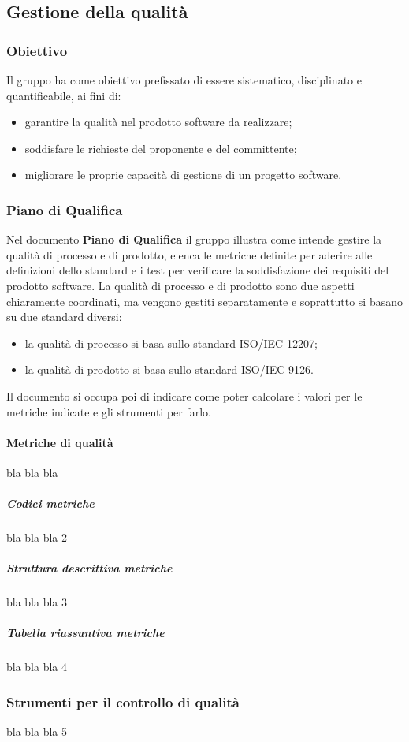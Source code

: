 \subsection{Gestione della qualità}
\subsubsection{Obiettivo}
Il gruppo \Gruppo{} ha come obiettivo prefissato di essere sistematico, disciplinato e quantificabile, ai fini di:
\begin{itemize}
    \item garantire la qualità nel prodotto software da realizzare;
    \item soddisfare le richieste del proponente e del committente;
    \item migliorare le proprie capacità di gestione di un progetto software.
\end{itemize}

\subsubsection{Piano di Qualifica}
Nel documento \textbf{Piano di Qualifica} il gruppo illustra come intende gestire la qualità di processo e di prodotto, elenca le metriche definite per aderire alle definizioni dello standard e i test per verificare la soddisfazione dei requisiti del prodotto software.
La qualità di processo e di prodotto sono due aspetti chiaramente coordinati, ma vengono gestiti separatamente e soprattutto si basano su due standard diversi:
\begin{itemize}
    \item la qualità di processo si basa sullo standard ISO/IEC 12207;
    \item la qualità di prodotto si basa sullo standard ISO/IEC 9126.
\end{itemize}
Il documento si occupa poi di indicare come poter calcolare i valori per le metriche indicate e gli strumenti per farlo.

\setlength{\parindent}{-0.1em}
\paragraph{Metriche di qualità}
bla bla bla
\subparagraph{Codici metriche}
bla bla bla 2
\subparagraph{Struttura descrittiva metriche}
bla bla bla 3
\subparagraph{Tabella riassuntiva metriche}
bla bla bla 4

\subsubsection{Strumenti per il controllo di qualità}
bla bla bla 5